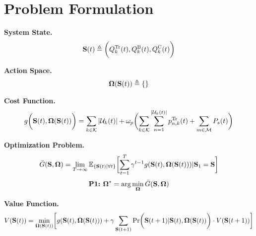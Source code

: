 \section{Problem Formulation}
\label{sec:formulation}

\textbf{System State.}
\begin{align}
    \mathbf{S}(t) \triangleq 
    \bigg(
        Q_{k}^{\mathrm{Tr}}(t),
        Q_{k}^{\mathrm{B}}(t),
        Q_{k}^{\mathrm{C}}(t)
    \bigg)
\end{align}

\textbf{Action Space.}
\begin{align}
    \boldsymbol{\Omega}(\mathbf{S}(t)) \triangleq \{
    \}
\end{align}

\textbf{Cost Function.}
\begin{align}
    g\Paren{\Stat(t), \Policy(\Stat(t))} =
        \sum_{k\in\mathcal{K}} |\mathcal{U}_{k}(t)| +
        \omega_{p} \Paren{
            \sum_{k\in\mathcal{K}}\sum_{n=1}^{|\mathcal{U}_{k}(t)|} p_{n,k}^{\mathrm{Tr}}(t) + \sum_{m\in\mathcal{M}} P_{s}(t)
        }
\end{align}

\textbf{Optimization Problem.}
\begin{align}
    \bar{G} (\Stat, \Policy) = \lim_{T\to\infty}
    \Expect_{\set{\Stat(t)|\forall t}} \Bracket{
        \sum_{t=1}^{T} \gamma^{t-1} g(\Stat(t), \Policy(\Stat(t))) | \Stat_1=\Stat
    }
\end{align}
\begin{align}
    \textbf{P1:~}
    \boldsymbol{\Omega}^* = \arg\min\limits_{\boldsymbol{\Omega}} \bar{G}(\mathbf{S}, \boldsymbol{\Omega})
\end{align}

\textbf{Value Function.}
\begin{align}
    V(\Stat(t)) = \min_{\Policy(\Stat(t))} \Bracket{
        g(\Stat(t), \Policy(\Stat(t))) +
        \gamma \sum_{\Stat(t+1)} \Pr\Paren{\Stat(t+1) | \Stat(t), \Policy(\Stat(t))} \cdot V(\Stat(t+1))
    }
\end{align}
